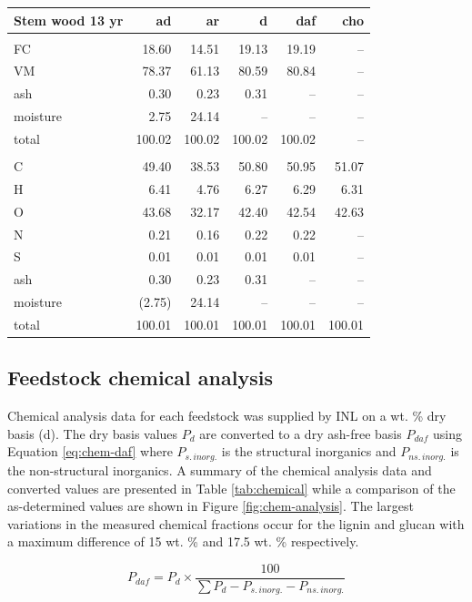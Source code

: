 \documentclass[12pt,titlepage]{article}
\begin{document}
\begin{longtable}{lrrrrr}
    \textbf{Stem wood 13 yr} & ad & ar & d & daf & cho \\
    \hline \\
    FC       & 18.60  & 14.51  & 19.13  & 19.19  & -- \\
    VM       & 78.37  & 61.13  & 80.59  & 80.84  & -- \\
    ash      & 0.30   & 0.23   & 0.31   & --     & -- \\
    moisture & 2.75   & 24.14  & --     & --     & -- \\
    total    & 100.02 & 100.02 & 100.02 & 100.02 & -- \\
    \\
    C        & 49.40  & 38.53  & 50.80  & 50.95  & 51.07 \\
    H        & 6.41   & 4.76   & 6.27   & 6.29   & 6.31 \\
    O        & 43.68  & 32.17  & 42.40  & 42.54  & 42.63 \\
    N        & 0.21   & 0.16   & 0.22   & 0.22   & -- \\
    S        & 0.01   & 0.01   & 0.01   & 0.01   & -- \\
    ash      & 0.30   & 0.23   & 0.31   & --     & -- \\
    moisture & (2.75) & 24.14  & --     & --     & -- \\
    total    & 100.01 & 100.01 & 100.01 & 100.01 & 100.01 \\
\end{longtable}

\subsection{Feedstock chemical analysis}

Chemical analysis data for each feedstock was supplied by INL on a wt. \% dry basis (d). The dry basis values $P_d$ are converted to a dry ash-free basis $P_{daf}$ using Equation \ref{eq:chem-daf} where $P_{s.\,inorg.}$ is the structural inorganics and $P_{ns.\,inorg.}$ is the non-structural inorganics. A summary of the chemical analysis data and converted values are presented in Table \ref{tab:chemical} while a comparison of the as-determined values are shown in Figure \ref{fig:chem-analysis}. The largest variations in the measured chemical fractions occur for the lignin and glucan with a maximum difference of 15 wt. \% and 17.5 wt. \% respectively.

\begin{equation}
    \label{eq:chem-daf}
    P_{daf} = P_d \times \frac{100}{\sum P_d - P_{s.\,inorg.} - P_{ns.\,inorg.}}
\end{equation}
\end{document}
